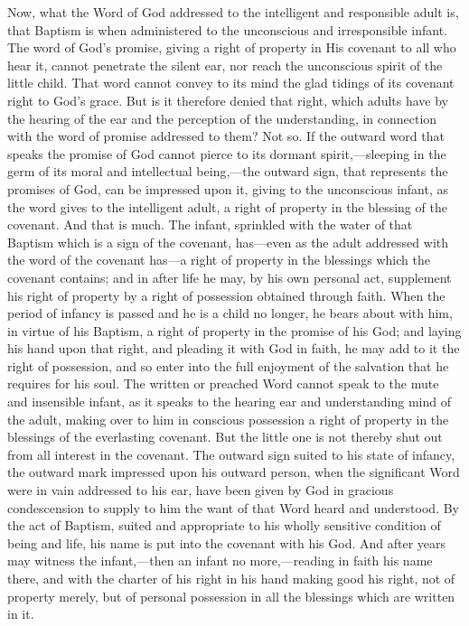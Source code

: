 \documentclass[english,]{book}
\begin{document}
Now, what the Word of God addressed to the intelligent and responsible adult is, that Baptism is when administered to the unconscious and irresponsible infant. The word of God's promise, giving a right of property in His covenant to all who hear it, cannot penetrate the silent ear, nor reach the unconscious spirit of the little child. That word cannot convey to its mind the glad tidings of its covenant right to God's grace. But is it therefore denied that right, which adults have by the hearing of the ear and the perception of the understanding, in connection with the word of promise addressed to them? Not so. If the outward word that speaks the promise of God cannot pierce to its dormant spirit,---sleeping in the germ of its moral and intellectual being,---the outward sign, that represents the promises of God, can be impressed upon it, giving to the unconscious infant, as the word gives to the intelligent adult, a right of property in the blessing of the covenant. And that is much. The infant, sprinkled with the water of that Baptism which is a sign of the covenant, has---even as the adult addressed with the word of the covenant has---a right of property in the blessings which the covenant contains; and in after life he may, by his own personal act, supplement his right of property by a right of possession obtained through faith. When the period of infancy is passed and he is a child no longer, he bears about with him, in virtue of his Baptism, a right of property in the promise of his God; and laying his hand upon that right, and pleading it with God in faith, he may add to it the right of possession, and so enter into the full enjoyment of the salvation that he requires for his soul. The written or preached Word cannot speak to the mute and insensible infant, as it speaks to the hearing ear and understanding mind of the adult, making over to him in conscious possession a right of property in the blessings of the everlasting covenant. But the little one is not thereby shut out from all interest in the covenant. The outward sign suited to his state of infancy, the outward mark impressed upon his outward person, when the significant Word were in vain addressed to his ear, have been given by God in gracious condescension to supply to him the want of that Word heard and understood. By the act of Baptism, suited and appropriate to his wholly sensitive condition of being and life, his name is put into the covenant with his God. And after years may witness the infant,---then an infant no more,---reading in faith his name there, and with the charter of his right in his hand making good his right, not of property merely, but of personal possession in all the blessings which are written in it.
\end{document}
